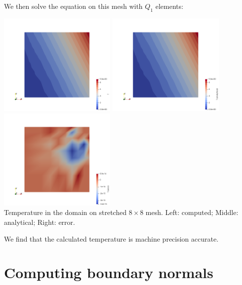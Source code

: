 We then solve the equation on this mesh with $Q_1$ elements:

\begin{center}
\includegraphics[width=5.7cm]{python_codes/fieldstone_173/results/T}
\includegraphics[width=5.7cm]{python_codes/fieldstone_173/results/T_analytical}
\includegraphics[width=5.7cm]{python_codes/fieldstone_173/results/T_error}\\
{\captionfont Temperature in the domain on stretched $8\times 8$ mesh. 
Left: computed; Middle: analytical; Right: error.}
\end{center}

We find that the calculated temperature is machine precision accurate.




\section*{Computing boundary normals}

